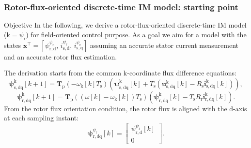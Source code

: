 \begin{frame}
    \frametitle{Rotor-flux-oriented discrete-time IM model: starting point}
    \begin{varblock}{Objective}
        In the following, we derive a rotor-flux-oriented discrete-time IM model ($\mathrm{k}=\psi_\mathrm{r}$) for field-oriented control purpose. As a goal we aim for a model with the states $\bm{x}^\top=[\psi^{\psi_\mathrm{r}}_{\mathrm{r,d}},\, i^{\psi_\mathrm{r}}_{\mathrm{s,d}},\, i^{\psi_\mathrm{r}}_{\mathrm{s,q}}]$ assuming an accurate stator current measurement and an accurate rotor flux estimation.
    \end{varblock}\pause%
    The derivation starts from the common $\mathrm{k}$-coordinate flux difference equations:
    \begin{equation*}
        \bm{\psi}^{\mathrm{k}}_{\mathrm{s,dq}}[k+1]
        =\bm{T}_\mathrm{p}(-\omega_\mathrm{k}[k]T_\mathrm{s})
        \left(\bm{\psi}^{\mathrm{k}}_{\mathrm{s,dq}}[k]
        +T_\mathrm{s}\left(\bm{u}^{\mathrm{k}}_{\mathrm{s,dq}}[k]
        -R_\mathrm{s}\bm{i}^{\mathrm{k}}_{\mathrm{s,dq}}[k]\right)\right),
    \end{equation*}
    \begin{equation*}
        \bm{\psi}^{\mathrm{k}}_{\mathrm{r,dq}}[k+1]
        =\bm{T}_\mathrm{p}((\omega[k]-\omega_\mathrm{k}[k])T_\mathrm{s})
        \left(\bm{\psi}^{\mathrm{k}}_{\mathrm{r,dq}}[k]
        -T_\mathrm{s}R_\mathrm{r}\bm{i}^{\mathrm{k}}_{\mathrm{r,dq}}[k]\right).
    \end{equation*}\pause%
    From the rotor flux orientation condition, the rotor flux is aligned with the $\mathrm{d}$-axis at each sampling instant:
    \begin{equation}
        \bm{\psi}^{\psi_\mathrm{r}}_{\mathrm{r,dq}}[k]
        =\begin{bmatrix}\psi^{\psi_\mathrm{r}}_{\mathrm{r,d}}[k]\\0\end{bmatrix}.
        \label{eq:IM_RFO_v5_orientation}
    \end{equation}
\end{frame}

